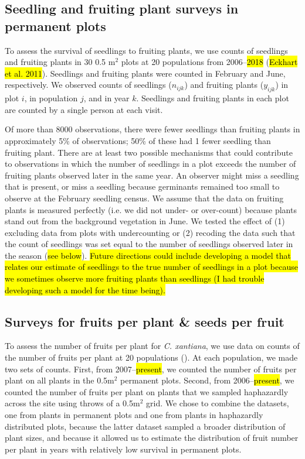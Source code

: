 \documentclass[12pt, oneside, titlepage]{article}   	%
\begin{document}
\subsection{Seedling and fruiting plant surveys in permanent plots}

To assess the survival of seedlings to fruiting plants, we use counts of seedlings and fruiting plants in 30 0.5 m$^2$ plots at 20 populations from 2006--\hl{2018} (\hl{Eckhart et al. 2011}). Seedlings and fruiting plants were counted in February and June, respectively. We observed counts of seedlings ($n_{ijk}$) and fruiting plants ($y_{ijk}$) in plot $i$, in population $j$, and in year $k$. Seedlings and fruiting plants in each plot are counted by a single person at each visit. 

Of more than 8000 observations, there were fewer seedlings than fruiting plants in approximately 5\% of observations; 50\% of these had 1 fewer seedling than fruiting plant. There are at least two possible mechanisms that could contribute to observations in which the number of seedlings in a plot exceeds the number of fruiting plants observed later in the same year. An observer might miss a seedling that is present, or miss a seedling because germinants remained too small to observe at the February seedling census. We assume that the data on fruiting plants is measured perfectly (i.e. we did not under- or over-count) because plants stand out from the background vegetation in June. We tested the effect of (1) excluding data from plots with undercounting or (2) recoding the data such that the count of seedlings was set equal to the number of seedlings observed later in the season (\hl{see below}). \hl{Future directions could include developing a model that relates our estimate of seedlings to the true number of seedlings in a plot because we sometimes observe more fruiting plants than seedlings (I had trouble developing such a model for the time being).}

\subsection{Surveys for fruits per plant \& seeds per fruit}

To assess the number of fruits per plant for \textit{C. xantiana}, we use data on counts of the number of fruits per plant at 20 populations (\cite{eckhart2011}). At each population, we made two sets of counts. First, from 2007--\hl{present}, we counted the number of fruits per plant on all plants in the 0.5m$^2$ permanent plots. Second, from 2006--\hl{present}, we counted the number of fruits per plant on plants that we sampled haphazardly across the site using throws of a 0.5m$^2$ grid. We chose to combine the datasets, one from plants in permanent plots and one from plants in haphazardly distributed plots, because the latter dataset sampled a broader distribution of plant sizes, and because it allowed us to estimate the distribution of fruit number per plant in years with relatively low survival in permanent plots. 
\end{document}
